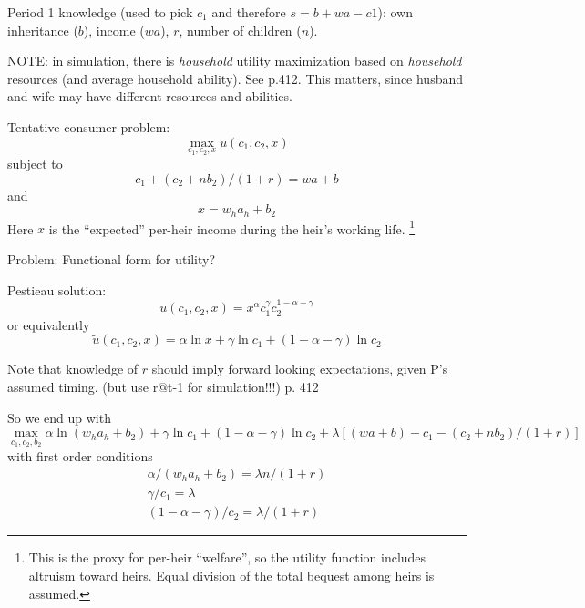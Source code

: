 \documentclass{article}
\begin{document}
Period 1 knowledge (used to pick $c_{1}$ and therefore $s = b+wa-c1$):
own inheritance ($b$),
income ($wa$),
$r$,
number of children ($n$).


NOTE: in simulation, there is \emph{household} utility maximization
based on \emph{household} resources (and average household ability).
See p.412.
This matters, since husband and wife may have different resources and abilities.


Tentative consumer problem:
\begin{equation}
\max_{c_{1},c_{2},x} u(c_{1}, c_{2}, x)
\end{equation}
subject to
\begin{equation}
c_{1} + (c_{2} + n b_{2})/(1+r) = w a + b
\label{Pestieau8} \tag{Pestieau 8}
\end{equation}
and
\begin{equation}
x = w_{h}a_{h}+ b_{2}
\end{equation}
Here $x$ is the ``expected'' per-heir income during the heir's working life.%
\footnote{%
This is the proxy for per-heir ``welfare'',
so the utility function includes altruism toward heirs.
Equal division of the total bequest among heirs is assumed.
} %
%



Problem: Functional form for utility?

Pestieau solution:
\begin{equation}\label{utility_fn}
u(c_{1}, c_{2}, x) = x^{\alpha} c_{1}^{\gamma} c_{2}^{1-\alpha-\gamma}
\end{equation}
or equivalently
\begin{equation}\label{ln_utility_fn}
\tilde{u}(c_{1}, c_{2}, x) = \alpha \ln x +\gamma \ln c_{1} + (1-\alpha-\gamma) \ln c_{2}
\end{equation}


Note that knowledge of $r$ should imply forward looking expectations,
given P's assumed timing.
(but use r@t-1 for simulation!!!) p. 412

So we end up with
\begin{equation}\label{u-max}
\max_{c_{1}, c_{2}, b_{2}}
\alpha \ln (w_{h}a_{h}+ b_{2})
+ \gamma \ln c_{1}
+ (1-\alpha-\gamma) \ln c_{2}
+ \lambda [ (w a + b) - c_{1} - (c_{2} + n b_{2})/(1+r)]
\end{equation}
with first order conditions
\begin{gather}
\alpha/(w_{h}a_{h}+b_{2}) = \lambda n/(1+r)
\label{dL/db2}
\\
\gamma/c_{1} = \lambda
\label{dL/dc1}
\\
(1-\alpha-\gamma)/ c_{2} = \lambda / (1+r)
\label{dL/dc2}
\end{gather}
\end{document}
